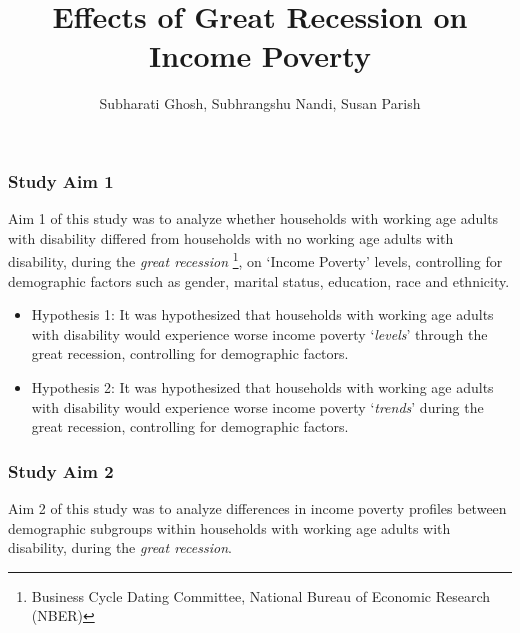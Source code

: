 \documentclass[11pt]{extarticle} %
\begin{document}
\doublespacing


\title{Effects of Great Recession on Income Poverty}
\author{Subharati Ghosh, Subhrangshu Nandi, Susan Parish \\
\date{}
}

\maketitle

\subsubsection*{Study Aim 1}
Aim 1 of this study was to analyze whether households with working age adults with disability differed from households with no working age adults with disability, during the {\emph{great recession}} \footnote{Business Cycle Dating Committee, National Bureau of Economic Research (NBER)}, on `Income Poverty' levels, controlling for demographic factors such as gender, marital status, education, race and ethnicity. 
\begin{itemize}
\item Hypothesis 1: It was hypothesized that households with working age adults with disability would experience worse income poverty `\textit{levels}' through the great recession, controlling for demographic factors.
\item Hypothesis 2: It was hypothesized that households with working age adults with disability would experience worse income poverty `\textit{trends}' during the great recession, controlling for demographic factors.
\end{itemize}

\subsubsection*{Study Aim 2}
Aim 2 of this study was to analyze differences in income poverty profiles between demographic subgroups within households with working age adults with disability, during the {\emph{great recession}}. 
\end{document}
